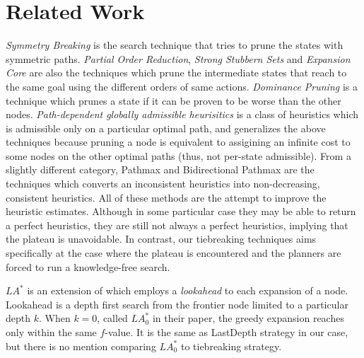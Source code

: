 \begin{figure}[htbp]
 \centering
 \caption{}
 \label{portfolio}
\end{figure}


\section{Related Work}
\label{sec-4}

\emph{Symmetry Breaking}
\cite{Fox1998,pochter2011exploiting,domshlak2013symmetry} is the search
technique that tries to prune the states with symmetric
paths. \emph{Partial Order Reduction}, \emph{Strong Stubbern Sets} and
\emph{Expansion Core} are also the techniques which prune the
intermediate states that reach to the same goal using the different
orders of same actions. \emph{Dominance Pruning} \cite{hall2013faster} is a
technique which prunes a state if it can be proven to be worse than the other nodes.
% 
\emph{Path-dependent globally admissible
heurisitics} \cite{karpas2012optimal} is a class of heuristics which is
admissible only on a particular optimal path, and generalizes the above
techniques because pruning a node is equivalent to assigining an
infinite cost to some nodes on the other optimal paths (thus, not
per-state admissible).
From a slightly different category, Pathmax \cite{mero1984heuristic} and
Bidirectional Pathmax \cite{felner2011inconsistent} are the techniques
which converts an inconsistent heuristics into non-decreasing,
consistent heuristics.
All of these methods are the
attempt to improve the heuristic estimates. Although in some particular
case they may be able to return a perfect heuristics, they are still not
always a perfect heuristics, implying that the plateau is unavoidable.
In contrast, our tiebreaking techniques aims specifically at the case
where the plateau is encountered and the planners are forced to run a
knowledge-free search.

$LA^*$ \cite{stern2010look} is an extension of \astar which employs a
\emph{lookahead} to each expansion of a node. Lookahead is a depth first
search from the frontier node limited to a particular depth $k$. When
$k=0$, called $LA^*_0$ in their paper, the greedy expansion reaches only within
the same $f$-value. It is the same as LastDepth strategy in our
case, but there is no mention comparing $LA^*_0$ to tiebreaking strategy.

